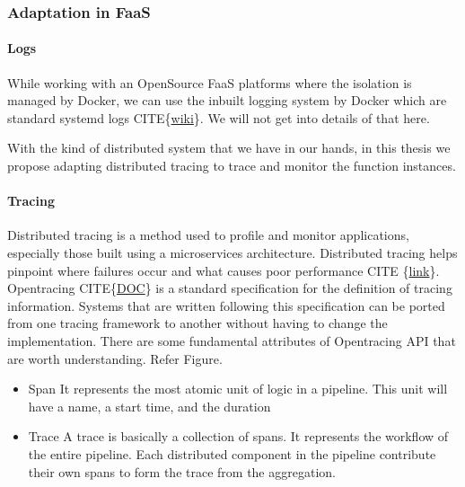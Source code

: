 \documentclass[12pt,titlepage]{article}
\begin{document}
\subsubsection{Adaptation in FaaS}
\label{sec:org4e17318}

\paragraph{Logs}
\label{sec:org5cf9c63}
While working with an OpenSource FaaS platforms where the isolation is managed
by Docker, we can use the inbuilt logging system by Docker which are standard
systemd logs CITE\{\href{https://en.wikipedia.org/wiki/Systemd}{wiki}\}. We will not get into details of that here.

With the kind of distributed system that we have in our hands, in this thesis we
propose adapting distributed tracing to trace and monitor the
function instances.

\paragraph{Tracing}
\label{sec:org70f061c}
Distributed tracing is a method used to profile and monitor applications,
especially those built using a microservices architecture. Distributed tracing
helps pinpoint where failures occur and what causes poor performance CITE
\{\href{https://medium.com/velotio-perspectives/a-comprehensive-tutorial-to-implementing-opentracing-with-jaeger-a01752e1a8ce}{link}\}. Opentracing CITE\{\href{https://opentracing.io/docs/}{DOC}\} is a standard specification for the definition of tracing
information. Systems that are written following this specification can be ported
from one tracing framework to another without having to change the
implementation. There are some fundamental attributes of Opentracing API that
are worth understanding. Refer Figure.
\begin{itemize}
\item Span
It represents the most atomic unit of logic in a pipeline. This unit will have
a name, a start time, and the duration
\item Trace
A trace is basically a collection of spans. It represents the workflow of the
entire pipeline. Each distributed component in the pipeline contribute their
own spans to form the trace from the aggregation.
\end{itemize}
\end{document}

